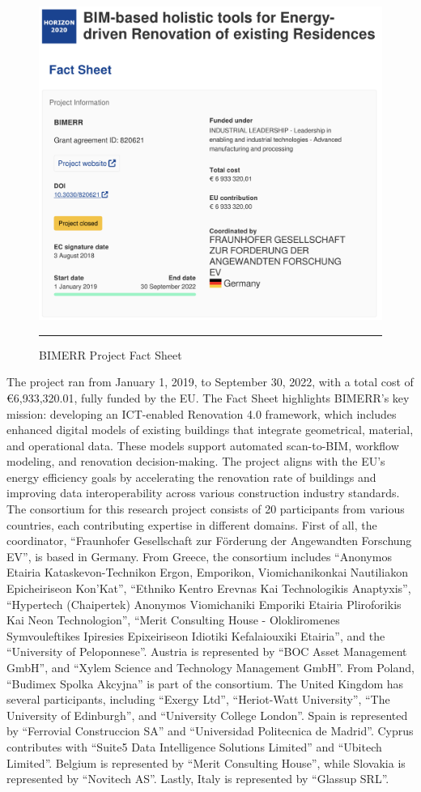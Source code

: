 \begin{figure}[htbp]
    \centering
 \includegraphics[width=.75\textwidth]{figures/scenario-analysis/bimerr-fact-sheet.png}
     \rule{35em}{0.5pt}
    \caption{BIMERR Project Fact Sheet}
 \label{fig:bimerr-fact-sheet}
\end{figure}

The project ran from January 1, 2019, to September 30, 2022, with a total cost of \euro 6,933,320.01, fully funded by the EU.
The Fact Sheet highlights BIMERR's key mission: developing an ICT-enabled Renovation 4.0 framework, which includes enhanced digital models of existing buildings that integrate geometrical, material, and operational data.
These models support automated scan-to-BIM, workflow modeling, and renovation decision-making.
The project aligns with the EU's energy efficiency goals by accelerating the renovation rate of buildings and improving data interoperability across various construction industry standards.
The consortium for this research project consists of 20 participants from various countries, each contributing expertise in different domains.
First of all, the coordinator, ``Fraunhofer Gesellschaft zur F\"orderung der Angewandten Forschung EV'', is based in Germany.
From Greece, the consortium includes ``Anonymos Etairia Kataskevon-Technikon Ergon, Emporikon, Viomichanikonkai Nautiliakon Epicheiriseon Kon'Kat'', ``Ethniko Kentro Erevnas Kai Technologikis Anaptyxis'', ``Hypertech (Chaipertek) Anonymos Viomichaniki Emporiki Etairia Pliroforikis Kai Neon Technologion'', ``Merit Consulting House - Olokliromenes Symvouleftikes Ipiresies Epixeiriseon Idiotiki Kefalaiouxiki Etairia'', and the ``University of Peloponnese''.
Austria is represented by ``BOC Asset Management GmbH'', and ``Xylem Science and Technology Management GmbH''.
From Poland, ``Budimex Spolka Akcyjna'' is part of the consortium.
The United Kingdom has several participants, including ``Exergy Ltd'', ``Heriot-Watt University'', ``The University of Edinburgh'', and ``University College London''.
Spain is represented by ``Ferrovial Construccion SA'' and ``Universidad Politecnica de Madrid''.
Cyprus contributes with ``Suite5 Data Intelligence Solutions Limited'' and ``Ubitech Limited''.
Belgium is represented by ``Merit Consulting House'', while Slovakia is represented by ``Novitech AS''.
Lastly, Italy is represented by ``Glassup SRL''.

